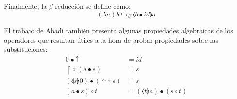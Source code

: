 Finalmente, la $\beta$-reducción se define como:
\[ (\lambda a)b \hookrightarrow_{\beta} \llangle b \bullet id \rrangle a \]

El trabajo de Abadi también presenta algunas propiedades algebraicas de los operadores que resultan útiles a la hora de probar propiedades sobre las substituciones:
\begin{align*}
	0 \; \bullet \uparrow &= id \\
	\uparrow \circ\; (a \bullet s) &= s \\
	(\llangle s \rrangle 0) \bullet (\uparrow \circ\; s) &= s \\
	(a \bullet s) \circ t &= (\llangle t \rrangle a) \bullet (s \circ t) \\
\end{align*}
 
